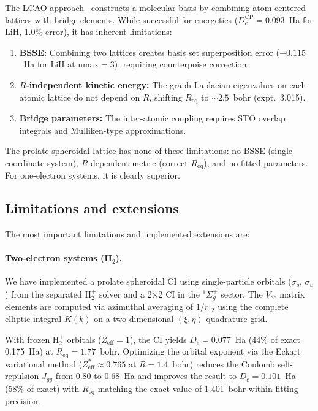 \documentclass[aps,pra,twocolumn,superscriptaddress,longbibliography]{revtex4-2}
\begin{document}
The LCAO approach~\cite{loutey_lcao_fci} constructs a molecular
basis by combining atom-centered lattices with bridge elements.
While successful for energetics ($D_e^{\text{CP}} = 0.093$~Ha
for LiH, 1.0\% error), it has inherent limitations:
\begin{enumerate}
  \item \textbf{BSSE:} Combining two lattices creates basis set
    superposition error ($-0.115$~Ha for LiH at nmax$= 3$),
    requiring counterpoise correction.
  \item \textbf{$R$-independent kinetic energy:} The graph Laplacian
    eigenvalues on each atomic lattice do not depend on $R$,
    shifting $R_{\mathrm{eq}}$ to $\sim 2.5$~bohr (expt.\ 3.015).
  \item \textbf{Bridge parameters:} The inter-atomic coupling
    requires STO overlap integrals and Mulliken-type approximations.
\end{enumerate}

The prolate spheroidal lattice has none of these limitations: no
BSSE (single coordinate system), $R$-dependent metric (correct
$R_{\mathrm{eq}}$), and no fitted parameters.  For one-electron
systems, it is clearly superior.

\subsection{Limitations and extensions}

The most important limitations and implemented extensions are:

\paragraph{Two-electron systems (H$_2$).}
We have implemented a prolate spheroidal CI using
single-particle orbitals ($\sigma_g$, $\sigma_u$) from the separated
H$_2^+$ solver and a 2$\times$2 CI in the $^1\Sigma_g^+$ sector.
The $V_{ee}$ matrix elements are computed via azimuthal averaging
of $1/r_{12}$ using the complete elliptic integral $K(k)$ on a
two-dimensional $(\xi, \eta)$ quadrature grid.

With frozen H$_2^+$ orbitals ($Z_{\mathrm{eff}} = 1$), the CI yields
$D_e = 0.077$~Ha (44\% of exact 0.175~Ha) at $R_{\mathrm{eq}} = 1.77$~bohr.
Optimizing the orbital exponent via the Eckart variational method
($Z_{\mathrm{eff}}^* \approx 0.765$ at $R = 1.4$~bohr) reduces
the Coulomb self-repulsion $J_{gg}$ from 0.80 to 0.68~Ha and improves the
result to $D_e = 0.101$~Ha (58\% of exact) with $R_{\mathrm{eq}}$
matching the exact value of 1.401~bohr within fitting precision.
\end{document}
